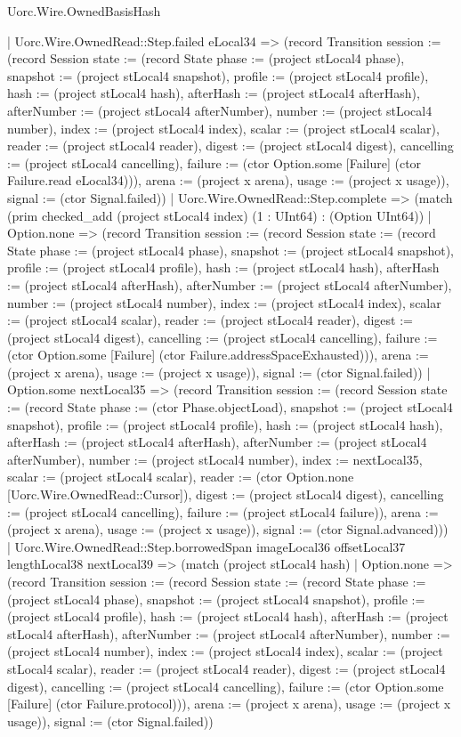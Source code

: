 \begin{lexlean}{Uorc.Wire.OwnedBasisHash}
\begin{semanticmodule}
{          | Uorc.Wire.OwnedRead::Step.failed eLocal34 => (record Transition {session := (record Session {state := (record State {phase := (project stLocal4 phase), snapshot := (project stLocal4 snapshot), profile := (project stLocal4 profile), hash := (project stLocal4 hash), afterHash := (project stLocal4 afterHash), afterNumber := (project stLocal4 afterNumber), number := (project stLocal4 number), index := (project stLocal4 index), scalar := (project stLocal4 scalar), reader := (project stLocal4 reader), digest := (project stLocal4 digest), cancelling := (project stLocal4 cancelling), failure := (ctor Option.some [Failure] (ctor Failure.read eLocal34))}), arena := (project x arena), usage := (project x usage)}), signal := (ctor Signal.failed)})
          | Uorc.Wire.OwnedRead::Step.complete => (match (prim checked_add (project stLocal4 index) (1 : UInt64) : (Option UInt64))
            | Option.none => (record Transition {session := (record Session {state := (record State {phase := (project stLocal4 phase), snapshot := (project stLocal4 snapshot), profile := (project stLocal4 profile), hash := (project stLocal4 hash), afterHash := (project stLocal4 afterHash), afterNumber := (project stLocal4 afterNumber), number := (project stLocal4 number), index := (project stLocal4 index), scalar := (project stLocal4 scalar), reader := (project stLocal4 reader), digest := (project stLocal4 digest), cancelling := (project stLocal4 cancelling), failure := (ctor Option.some [Failure] (ctor Failure.addressSpaceExhausted))}), arena := (project x arena), usage := (project x usage)}), signal := (ctor Signal.failed)})
            | Option.some nextLocal35 => (record Transition {session := (record Session {state := (record State {phase := (ctor Phase.objectLoad), snapshot := (project stLocal4 snapshot), profile := (project stLocal4 profile), hash := (project stLocal4 hash), afterHash := (project stLocal4 afterHash), afterNumber := (project stLocal4 afterNumber), number := (project stLocal4 number), index := nextLocal35, scalar := (project stLocal4 scalar), reader := (ctor Option.none [Uorc.Wire.OwnedRead::Cursor]), digest := (project stLocal4 digest), cancelling := (project stLocal4 cancelling), failure := (project stLocal4 failure)}), arena := (project x arena), usage := (project x usage)}), signal := (ctor Signal.advanced)}))
          | Uorc.Wire.OwnedRead::Step.borrowedSpan imageLocal36 offsetLocal37 lengthLocal38 nextLocal39 => (match (project stLocal4 hash)
            | Option.none => (record Transition {session := (record Session {state := (record State {phase := (project stLocal4 phase), snapshot := (project stLocal4 snapshot), profile := (project stLocal4 profile), hash := (project stLocal4 hash), afterHash := (project stLocal4 afterHash), afterNumber := (project stLocal4 afterNumber), number := (project stLocal4 number), index := (project stLocal4 index), scalar := (project stLocal4 scalar), reader := (project stLocal4 reader), digest := (project stLocal4 digest), cancelling := (project stLocal4 cancelling), failure := (ctor Option.some [Failure] (ctor Failure.protocol))}), arena := (project x arena), usage := (project x usage)}), signal := (ctor Signal.failed)})
}
\end{semanticmodule}
\end{lexlean}
